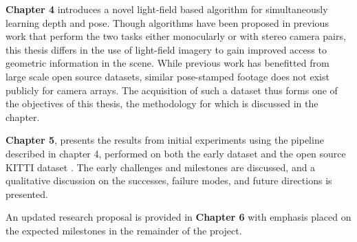 \textbf{Chapter 4} introduces a novel light-field based algorithm for simultaneously learning depth and pose. Though algorithms have been proposed in previous work that perform the two tasks either monocularly or with stereo camera pairs, this thesis differs in the use of light-field imagery to gain improved access to geometric information in the scene. While previous work has benefitted from large scale open source datasets, similar pose-stamped footage does not exist publicly for camera arrays. The acquisition of such a dataset thus forms one of the objectives of this thesis, the methodology for which is discussed in the chapter.

\textbf{Chapter 5}, presents the results from initial experiments using the pipeline described in chapter 4, performed on both the early dataset and the open source KITTI dataset \cite{dataset-kitti}. The early challenges and milestones are discussed, and a qualitative discussion on the successes, failure modes, and future directions is presented. 

An updated research proposal is provided in \textbf{Chapter 6} with emphasis placed on the expected milestones in the remainder of the project. 